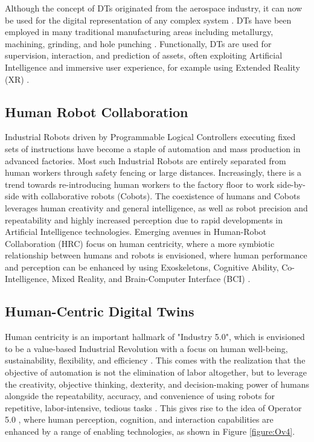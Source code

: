 Although the concept of DTs originated from the aerospace industry, it can now be used for the digital representation of any complex system \cite{Ammar2022}. DTs have been employed in many traditional manufacturing areas including metallurgy, machining, grinding, and hole punching \cite{Liu2021-Review}. Functionally, DTs are used for supervision, interaction, and prediction of assets, often exploiting Artificial Intelligence and immersive user experience, for example using Extended Reality (XR) \cite{Turner2022}.

\subsection{Human Robot Collaboration}
Industrial Robots driven by Programmable Logical Controllers executing fixed sets of instructions have become a staple of automation and mass production in advanced factories. Most such Industrial Robots are entirely separated from human workers through safety fencing or large distances. Increasingly, there is a trend towards re-introducing human workers to the factory floor to work side-by-side with collaborative robots (Cobots). The coexistence of humans and Cobots leverages human creativity and general intelligence, as well as robot precision and repeatability and highly increased perception due to rapid developments in Artificial Intelligence technologies. Emerging avenues in Human-Robot Collaboration (HRC) focus on human centricity, where a more symbiotic relationship between humans and robots is envisioned, where human performance and perception can be enhanced by using Exoskeletons, Cognitive Ability, Co-Intelligence, Mixed Reality, and Brain-Computer Interface (BCI) \cite{Wang-FuturePerspective-2022}.

\subsection{Human-Centric Digital Twins}
Human centricity is an important hallmark of "Industry 5.0", which is envisioned to be a value-based Industrial Revolution with a focus on human well-being, sustainability, flexibility, and efficiency \cite{Xu2021}. This comes with the realization that the objective of automation is not the elimination of labor altogether, but to leverage the creativity, objective thinking, dexterity, and decision-making power of humans alongside the repeatability, accuracy, and convenience of using robots for repetitive, labor-intensive, tedious tasks \cite{Land2020}. This gives rise to the idea of Operator 5.0 \cite{Wang2022-HCPSPerspective}, where human perception, cognition, and interaction capabilities are enhanced by a range of enabling technologies, as shown in Figure \ref{figure:Ov4}.

